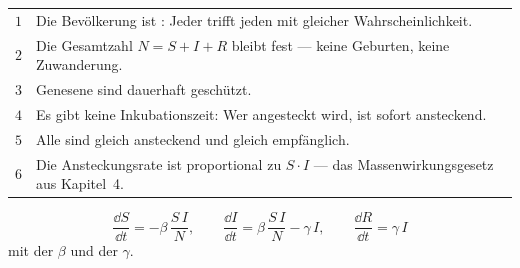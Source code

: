 \begin{merksatz}
\begin{center}
{\small
\renewcommand{\arraystretch}{1.5}
\begin{tabular}{@{}P{0.7cm}P{7.7cm}@{}}
\toprule
$1$ & Die Bevölkerung ist : Jeder trifft jeden mit gleicher Wahrscheinlichkeit.\\
$2$ & Die Gesamtzahl $N = S+I+R$ bleibt fest --- keine Geburten, keine Zuwanderung.\\
$3$ & Genesene sind dauerhaft geschützt.\\
$4$ & Es gibt keine Inkubationszeit: Wer angesteckt wird, ist sofort ansteckend.\\
$5$ & Alle sind gleich ansteckend und gleich empfänglich.\\
$6$ & Die Ansteckungsrate ist proportional zu $S \cdot I$ --- das Massenwirkungsgesetz aus Kapitel~4.\\
\bottomrule
\end{tabular}}
\end{center}

\begin{center}
\begin{minipage}{0.88\textwidth}
\end{minipage}
\end{center}
\end{merksatz}

\begin{definition}
\[ \frac{\dd S}{\dd t} = -\beta\,\frac{S\,I}{N}, \qquad
\frac{\dd I}{\dd t} = \beta\,\frac{S\,I}{N} - \gamma\,I, \qquad
\frac{\dd R}{\dd t} = \gamma\,I \]
mit der  $\beta$ und der  $\gamma$.
\end{definition}


